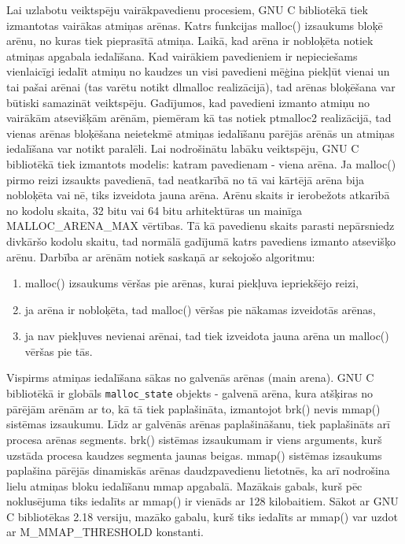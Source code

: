 Lai uzlabotu veiktspēju vairākpavedienu procesiem, GNU C bibliotēkā tiek izmantotas vairākas atmiņas arēnas. 
Katrs funkcijas malloc() izsaukums bloķē arēnu, no kuras tiek pieprasītā atmiņa. 
Laikā, kad arēna ir nobloķēta notiek atmiņas apgabala iedalīšana.
Kad vairākiem pavedieniem ir nepieciešams vienlaicīgi iedalīt atmiņu no kaudzes un visi pavedieni mēģina piekļūt vienai un tai pašai arēnai (tas varētu notikt dlmalloc realizācijā), tad arēnas bloķēšana var būtiski samazināt veiktspēju.
Gadījumos, kad pavedieni izmanto atmiņu no vairākām atsevišķām arēnām, piemēram kā tas notiek ptmalloc2 realizācijā, tad vienas arēnas bloķēšana neietekmē atmiņas iedalīšanu parējās arēnās un atmiņas iedalīšana var notikt paralēli.
Lai nodrošinātu labāku veiktspēju, GNU C bibliotēkā tiek izmantots modelis: katram pavedienam - viena arēna. 
Ja malloc() pirmo reizi izsaukts pavedienā, tad neatkarībā no tā vai kārtējā arēna bija nobloķēta vai nē, tiks izveidota jauna arēna.
Arēnu skaits ir ierobežots atkarībā no kodolu skaita, 32 bitu vai 64 bitu arhitektūras un mainīga MALLOC\_ARENA\_MAX vērtības.
Tā kā pavedienu skaits parasti nepārsniedz divkāršo kodolu skaitu, tad normālā gadījumā katrs pavediens izmanto atsevišķo arēnu. 
Darbība ar arēnām notiek saskaņā ar sekojošo algoritmu: 
\begin{enumerate}
\item malloc() izsaukums vēršas pie arēnas, kurai piekļuva iepriekšējo reizi,
\item ja arēna ir nobloķēta, tad malloc() vēršas pie nākamas izveidotās arēnas,
\item ja nav piekļuves nevienai arēnai, tad tiek izveidota jauna arēna un malloc() vēršas pie tās.
\end{enumerate}

Vispirms atmiņas iedalīšana sākas no galvenās arēnas (main arena). 
GNU C bibliotēkā ir globāls \texttt{malloc\_state} objekts - galvenā arēna, kura atšķiras no pārējām arēnām ar to, kā tā tiek paplašināta, izmantojot brk() nevis  mmap() sistēmas izsaukumu. 
Līdz ar galvēnās arēnas paplašināšanu, tiek paplašināts arī procesa arēnas segments.
brk() sistēmas izsaukumam ir viens arguments, kurš uzstāda procesa kaudzes segmenta jaunas beigas.
mmap() sistēmas izsaukums paplašina pārējās dinamiskās arēnas daudzpavedienu lietotnēs, ka arī nodrošina lielu atmiņas bloku iedalīšanu mmap apgabalā.
Mazākais gabals, kurš pēc noklusējuma tiks iedalīts ar mmap()  ir vienāds ar 128 kilobaitiem. 
Sākot ar GNU C bibliotēkas 2.18 versiju, mazāko gabalu, kurš tiks iedalīts ar mmap() var uzdot ar M\_MMAP\_THRESHOLD konstanti.





